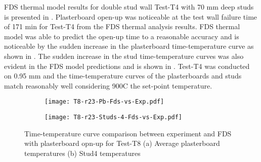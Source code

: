 FDS thermal model results for double stud wall Test-T4 with 70 mm deep studs is presented in . Plasterboard open-up was noticeable at the test wall failure time of 171 min for Test-T4 from the FDS thermal analysis results. FDS thermal model was able to predict the open-up time to a reasonable accuracy and is noticeable by the sudden increase in the plasterboard time-temperature curve as shown in . The sudden increase in the stud time-temperature curves was also evident in the FDS model predictions and is shown in . Test-T4 was conducted on 0.95 mm and the time-temperature curves of the plasterboards and  studs match reasonably well considering 900\degree C the set-point temperature. 
\begin{figure}[!htbp]
	\centering
	\begin{subfigure}[b]{0.6\textwidth}
		\centering
		\texttt{[image: T8-r23-Pb-Fds-vs-Exp.pdf]}
		\caption{}
		\label{subfig:T8-r23-Pb-Fds-vs-Exp}
	\end{subfigure}
	\begin{subfigure}[b]{0.6\textwidth}
		\centering
		\texttt{[image: T8-r23-Studs-4-Fds-vs-Exp.pdf]}
		\caption{}
		\label{subfig:T8-r23-Studs-4-Fds-vs-Exp}
	\end{subfigure}
	   \caption{Time-temperature curve comparison between experiment and FDS with plasterboard opn-up for Test-T8 (a) Average plasterboard temperatures (b) Stud4 temperatures}
	   \label{fig:T8-fds-output-pbop}
\end{figure}

